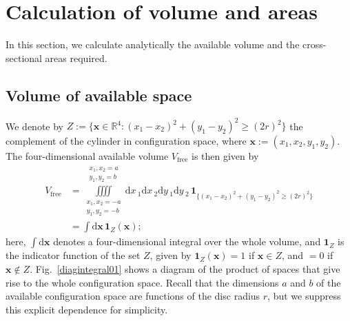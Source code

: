 \documentclass[superscriptaddress,pre,reprint,showpacs,twocolumn]{revtex4-1}
\newcommand{\rd}[1]{\mathrm{d}{#1} \,}
\newcommand{\indicatorsymbol}{\mathbf{1}}
\newcommand{\indicator}[1]{\indicatorsymbol_{ \{   #1 \} } }
\begin{document}
\section{Calculation of volume and areas}

In this section, we calculate analytically the available volume and the cross-sectional areas required.

\subsection{Volume of available space}

We denote by $Z := \{ \mathbf{x} \in \mathbb{R}^4: (x_1-x_2)^2 + (y_1-y_2)^2 \ge (2r)^2 \}$
the complement of the cylinder in configuration space, where $\mathbf{x} := (x_1, x_2, y_1, y_2)$.
The four-dimensional available volume $V_\text{free}$ is then given by
\begin{align}\label{volindic}
V_\text{free} &= 
\iiiint
\limits_{\substack{x_1, x_2 = -a \\ y_1, y_2 = -b}}^{\substack{x_1, x_2 = a \\ y_1, y_2 = b}}
\rd x_1 \rd x_2 \rd y_1 \rd y_2 
\, \indicator{ (x_1-x_2)^2 + (y_1-y_2)^2 \ge (2r)^2 } \\
&=
\int  \mathrm{d} \mathbf{x} \, \indicatorsymbol_Z(\mathbf{x});
\end{align}
here, $\int  \mathrm{d} \mathbf{x}$
denotes a four-dimensional integral over the whole volume, and 
$\indicatorsymbol_Z$ is the indicator function of the set $Z$, 
given by $\indicatorsymbol_Z (\mathbf{x}) = 1$ if $\mathbf{x} \in Z$, and $=0$ if $\mathbf{x} \notin Z$.
Fig.~\ref{diagintegral01} shows a diagram of the product of
spaces that give rise to the whole configuration space.
Recall that the dimensions $a$ and $b$ of the available configuration space are functions of the disc radius $r$, 
but we suppress this explicit dependence for simplicity.
\end{document}
